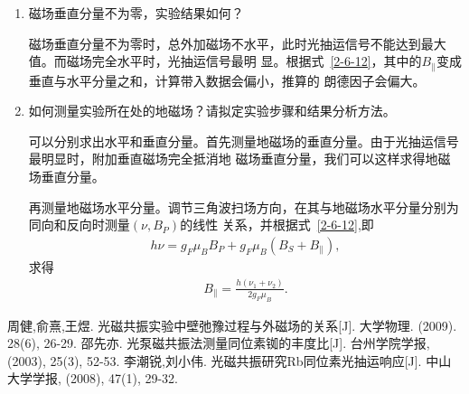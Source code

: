 \documentclass[11pt,a4paper]{article}
\begin{document}
\begin{spacing}{1.3}
\begin{CJK*}{UTF8}{gbsn}
\begin{enumerate}
\item  磁场垂直分量不为零，实验结果如何？\par 
磁场垂直分量不为零时，总外加磁场不水平，此时光抽运信号不能达到最大值。而磁场完全水平时，光抽运信号最明
显。根据式~\eqref{2-6-12}，其中的$B_{\parallel}$变成垂直与水平分量之和，计算带入数据会偏小，推算的
朗德因子会偏大。
\item  如何测量实验所在处的地磁场？请拟定实验步骤和结果分析方法。\par
可以分别求出水平和垂直分量。首先测量地磁场的垂直分量。由于光抽运信号最明显时，附加垂直磁场完全抵消地
磁场垂直分量，我们可以这样求得地磁场垂直分量。\par 
再测量地磁场水平分量。调节三角波扫场方向，在其与地磁场水平分量分别为同向和反向时测量$(\nu,B_P)$的线性
关系，并根据式~\eqref{2-6-12},即
\begin{eqnarray} 
h\nu=g_F\mu_BB_P+g_F\mu_B(B_S+B_{\parallel}),
\end{eqnarray}
求得
\begin{eqnarray} 
B_{\parallel}=\frac{h(\nu_1+\nu_2)}{2 g_F\mu_B}.
\end{eqnarray}
\end{enumerate}




\medskip
\renewcommand{\refname}{参考文献}
\begin{thebibliography}{99}
周健,俞熹,王煜. 光磁共振实验中壁弛豫过程与外磁场的关系[J]. 大学物理. (2009). 28(6), 26-29.
邵先亦. 光泵磁共振法测量同位素铷的丰度比[J]. 台州学院学报, (2003), 25(3), 52-53.
李潮锐,刘小伟. 光磁共振研究Rb同位素光抽运响应[J]. 中山大学学报, (2008), 47(1), 29-32.
\end{thebibliography}
\end{CJK*}
%
\end{spacing}
\end{document}
